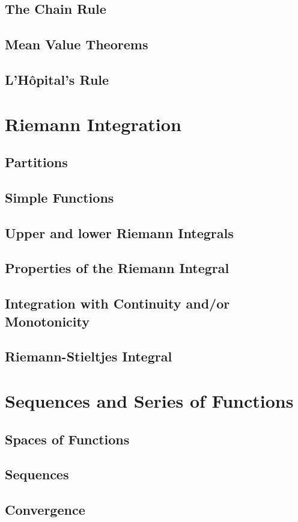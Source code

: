\documentclass{article}
\theoremstyle{definition}
\begin{document}
\subsection{The Chain Rule}
\subsection{Mean Value Theorems}
\subsection{L'H\^{o}pital's Rule}
\section{Riemann Integration}
\subsection{Partitions}
\subsection{Simple Functions}
\subsection{Upper and lower Riemann Integrals}
\subsection{Properties of the Riemann Integral}
\subsection{Integration with Continuity and/or Monotonicity}
\subsection{Riemann-Stieltjes Integral}
\section{Sequences and Series of Functions}
\subsection{Spaces of Functions}
\subsection{Sequences}
\subsection{Convergence}
\end{document}
